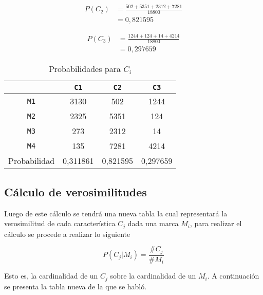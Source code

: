 \documentclass{article}
\begin{document}
\begin{equation} \label{des6}
\begin{split}
 P(C_{2}) & =  \frac{502 + 5351 + 2312 + 7281}{18800} \\
 & = 0,821595
\end{split}
\end{equation}

\begin{equation} \label{des7}
\begin{split}
 P(C_{3}) & =  \frac{1244 + 124 + 14 + 4214}{18800} \\
 & = 0,297659
\end{split}
\end{equation}

\begin{table}[ht]
\caption{Probabilidades para $C_{i}$}
\centering
\begin{tabular}{c | c c c }
\hline
		& \texttt{C1} & \texttt{C2} & \texttt{C3} \\ \hline
\texttt{M1} 	&     3130   &      502    &     1244     \\
\texttt{M2} 	&     2325   &      5351    &     124     \\
\texttt{M3} 	&     273   &      2312    &     14     \\
\texttt{M4} 	&     135   &      7281    &     4214  \\ \hline
Probabilidad	& 0,311861	& 0,821595	& 0,297659	\\
\hline
\end{tabular}
\label{tab:probci}
\end{table}

\subsection*{C\'alculo de verosimilitudes}
Luego de este c\'alculo se tendr\'a una nueva tabla la cual representar\'a la
verosimilitud de cada caracter\'istica $C_{j}$ dada una marca $M_{i}$, para
realizar el c\'alculo se procede a realizar lo siguiente

\begin{equation} \label{eq8}
P(C_{j}|M_{i})=\frac{\#C_{j}}{\#M_{i}}
\end{equation}

Esto es, la cardinalidad de un $C_{j}$ sobre la cardinalidad de un $M_{i}$. A
continuaci\'on se presenta la tabla nueva de la que se habl\'o.
\end{document}
